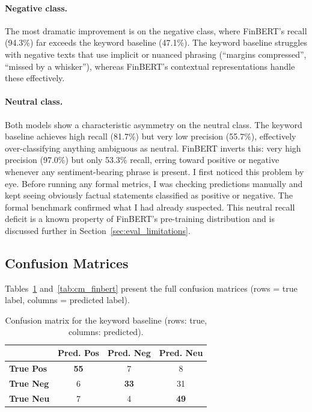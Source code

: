 \paragraph{Negative class.}  The most dramatic improvement is on the negative class, where FinBERT's recall (94.3\%) far exceeds the keyword baseline (47.1\%).  The keyword baseline struggles with negative texts that use implicit or nuanced phrasing (``margins compressed'', ``missed by a whisker''), whereas FinBERT's contextual representations handle these effectively.

\paragraph{Neutral class.}  Both models show a characteristic asymmetry on the neutral class. The keyword baseline achieves high recall (81.7\%) but very low precision (55.7\%), effectively over-classifying anything ambiguous as neutral. FinBERT inverts this: very high precision (97.0\%) but only 53.3\% recall, erring toward positive or negative whenever any sentiment-bearing phrase is present. I first noticed this problem by eye. Before running any formal metrics, I was checking predictions manually and kept seeing obviously factual statements classified as positive or negative. The formal benchmark confirmed what I had already suspected. This neutral recall deficit is a known property of FinBERT's pre-training distribution and is discussed further in Section~\ref{sec:eval_limitations}.

\subsection{Confusion Matrices}

Tables~\ref{tab:cm_keyword} and~\ref{tab:cm_finbert} present the full confusion matrices (rows = true label, columns = predicted label).

\begin{table}[H]
  \centering
  \caption{Confusion matrix for the keyword baseline (rows: true, columns: predicted).}
  \label{tab:cm_keyword}
  \begin{tabular}{@{}lccc@{}}
    \toprule
    & \textbf{Pred. Pos} & \textbf{Pred. Neg} & \textbf{Pred. Neu} \\
    \midrule
    \textbf{True Pos} & \textbf{55} & 7 & 8 \\
    \textbf{True Neg} & 6 & \textbf{33} & 31 \\
    \textbf{True Neu} & 7 & 4 & \textbf{49} \\
    \bottomrule
  \end{tabular}
\end{table}

